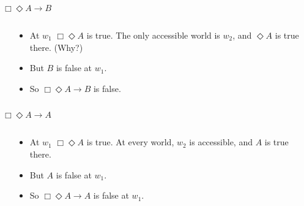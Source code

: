 \documentclass[
  14pt,
  letterpaper,
  ignorenonframetext,
  aspectratio=169,
]{beamer}
\begin{document}
\begin{frame}{\(\Box \Diamond A \rightarrow B\)}
\protect\hypertarget{box-diamond-a-rightarrow-b}{}
\begin{columns}
    \begin{column}{0.45\textwidth}
    \end{column}
    \begin{column}{0.5\textwidth}
    \begin{itemize}
    \item At $w_1$ $\Box \Diamond A$ is true. The only accessible world is $w_2$, and $\Diamond A$ is true there. (Why?)
    \item But $B$ is false at $w_1$.
    \item So $\Box \Diamond A \rightarrow B$ is false.
    \end{itemize}
  \end{column}
\end{columns}
\end{frame}

\begin{frame}{\(\Box \Diamond A \rightarrow A\)}
\protect\hypertarget{box-diamond-a-rightarrow-a}{}
\begin{columns}
    \begin{column}{0.45\textwidth}
    \end{column}
    \begin{column}{0.5\textwidth}
    \begin{itemize}
    \item At $w_1$ $\Box \Diamond A$ is true. At every world, $w_2$ is accessible, and $A$ is true there.
    \item But $A$ is false at $w_1$.
    \item So $\Box \Diamond A \rightarrow A$ is false at $w_1$.
    \end{itemize}
  \end{column}
\end{columns}
\end{frame}
\end{document}
